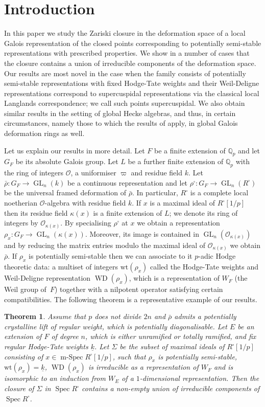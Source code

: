 \documentclass[JEP,XML,SOM,Unicode,NoEqCountersInSection]{cedram}
\let\mathcal\mathscr
\newcommand{\ssquare}{{\scriptscriptstyle\square}}
\newtheorem{thm}[prop]{Theorem}
\theoremstyle{definition}
\DeclareMathOperator{\GL}{GL}
\DeclareMathOperator{\WD}{WD}
\DeclareMathOperator{\Spec}{Spec}
\DeclareMathOperator{\mSpec}{m-Spec}
\newcommand{\Qp}{\mathbb {Q}_p}
\newcommand{\cO}{\mathcal{O}}
\newcommand{\wt}{\mathrm{wt}}
\newcommand{\rhobar}{\bar{\rho}}
\begin{document}
\section{Introduction} In this paper we study the Zariski closure in the deformation space
of a local Galois representation of the closed points corresponding to potentially semi-stable representations with prescribed properties. We show in a number of cases that the closure contains a union of irreducible components of the deformation space. Our results are most novel in the case when the family consists of potentially semi-stable representations with fixed Hodge-Tate weights and their Weil-Deligne representations correspond to supercuspidal representations via the classical local Langlands correspondence; we call such points supercuspidal. We also obtain similar results in the setting of global Hecke algebras, and thus,
in certain circumstances, namely those to which the results of \cite{HMS} apply, in global
Galois deformation rings as well.

Let us explain our results in more detail. Let $F$ be a finite extension of $\Qp$ and let $G_F$ be its absolute Galois group. Let $L$ be a
further finite extension of $\Qp$ with the ring of integers $\cO$, a uniformiser $\varpi$ and residue field $k$. Let $\rhobar: G_F \to \GL_n(k)$ be a continuous representation
and let $\rho^\ssquare: G_F\to \GL_n(R^\ssquare)$ be the universal framed
deformation of $\rhobar$. In particular, $R^\ssquare$ is a complete local noetherian
$\cO$-algebra with residue field $k$. If $x$ is a maximal ideal of $R^\ssquare [1/p]$ then
its residue field $\kappa(x)$ is a finite extension of $L$; we denote its ring of integers by $\cO_{\kappa(x)}$. By specialising $\rho^\ssquare$ at
$x$ we obtain a representation $\rho_x: G_F\to \GL_n(\kappa(x))$. Moreover,
its image is contained in $\GL_n(\cO_{\kappa(x)})$ and by reducing the matrix entries modulo
the maximal ideal of $\cO_{\kappa(x)}$ we obtain $\rhobar$. If $\rho_x$ is potentially semi-stable then we can associate to it $p$-adic Hodge theoretic data: a multiset of integers
$\wt(\rho_x)$ called the Hodge-Tate weights and Weil-Deligne representation
$\WD(\rho_x)$, which is a representation of $W_F$ (the Weil group of~$F$)
together with a nilpotent operator satisfying certain compatibilities. The following theorem is a representative example of our results.

\begin{thm}\label{A} Assume that $p$ does not divide $2n$ and $\rhobar$ admits a potentially crystalline lift of regular weight, which is
potentially diagonalisable. Let $E$ be an extension of $F$ of degree $n$, which is either unramified or totally ramified, and fix regular Hodge-Tate weights $\underline{k}$.
Let $\Sigma$ be the subset of maximal ideals of $R^\ssquare [1/p]$ consisting of $x\in \mSpec R^\ssquare [1/p]$, such that $\rho_x$ is potentially semi-stable, $\wt(\rho_x)= \underline{k}$,
$\WD(\rho_x)$ is irreducible as a representation of $W_F$ and is isomorphic to an induction from $W_E$ of a $1$-dimensional representation. Then the closure of $\Sigma$ in $\Spec R^\ssquare$ contains a non-empty
union of irreducible components of $\Spec R^\ssquare$.
\end{thm}
\end{document}
